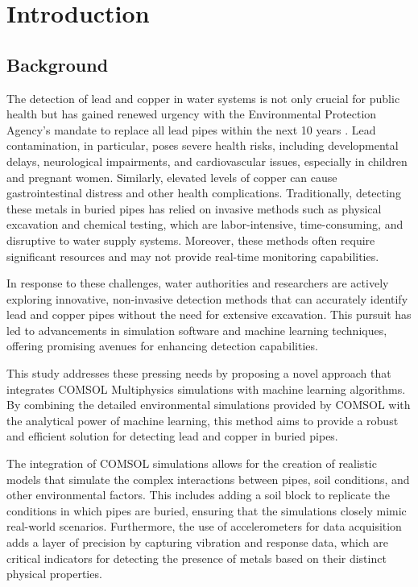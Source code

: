

\chapter{Introduction}

\section{Background}
\label{sec:testbib}

The detection of lead and copper in water systems is not only crucial for public health but has gained renewed urgency with the Environmental Protection Agency's mandate to replace all lead pipes within the next 10 years \cite{epa_lead_2023}. Lead contamination, in particular, poses severe health risks, including developmental delays, neurological impairments, and cardiovascular issues, especially in children and pregnant women. Similarly, elevated levels of copper can cause gastrointestinal distress and other health complications.
Traditionally, detecting these metals in buried pipes has relied on invasive methods such as physical excavation and chemical testing, which are labor-intensive, time-consuming, and disruptive to water supply systems. Moreover, these methods often require significant resources and may not provide real-time monitoring capabilities.

In response to these challenges, water authorities and researchers are actively exploring innovative, non-invasive detection methods that can accurately identify lead and copper pipes without the need for extensive excavation. This pursuit has led to advancements in simulation software and machine learning techniques, offering promising avenues for enhancing detection capabilities.

This study addresses these pressing needs by proposing a novel approach that integrates COMSOL Multiphysics simulations with machine learning algorithms. By combining the detailed environmental simulations provided by COMSOL with the analytical power of machine learning, this method aims to provide a robust and efficient solution for detecting lead and copper in buried pipes.

The integration of COMSOL simulations allows for the creation of realistic models that simulate the complex interactions between pipes, soil conditions, and other environmental factors. This includes adding a soil block to replicate the conditions in which pipes are buried, ensuring that the simulations closely mimic real-world scenarios. Furthermore, the use of accelerometers for data acquisition adds a layer of precision by capturing vibration and response data, which are critical indicators for detecting the presence of metals based on their distinct physical properties.

